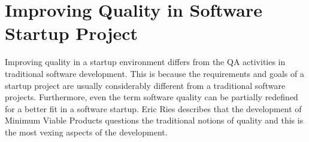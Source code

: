 
 \chapter{Improving Quality in Software Startup Project}

Improving quality in a startup environment differs from the QA activities in traditional software development. This is because the requirements and goals of a startup project are usually considerably different from a traditional software projects. Furthermore, even the term software quality can be partially redefined for a better fit in a software startup. Eric Ries describes that the development of Minimum Viable Products questions the traditional notions of quality and this is the most vexing aspects of the development.~\cite{ries2011lean}




